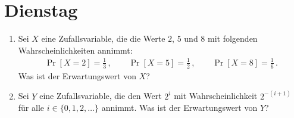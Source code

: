 \documentclass{uebung_cs}
\begin{document}
\section*{Dienstag}

\begin{exercise}[Erwartungswerte][\athome]
	\begin{enumerate}
		\item\easy Sei $X$ eine Zufallsvariable, die die Werte $2$, $5$ und $8$ mit folgenden Wahrscheinlichkeiten annimmt:
		\begin{align*}
			\Pr[X=2] = \tfrac{1}{3}\,,\qquad
			\Pr[X=5] = \tfrac{1}{2}\,,\qquad
			\Pr[X=8] = \tfrac{1}{6}\,.
		\end{align*}
		Was ist der Erwartungswert von $X$?
		
		\item\medium Sei $Y$ eine Zufallsvariable, die den Wert $2^i$ mit Wahrscheinlichkeit $2^{-(i+1)}$ für alle $i \in \{0,1,2,\dots\}$ annimmt.
		Was ist der Erwartungswert von $Y$?
	\end{enumerate}	
\end{exercise}
\end{document}
